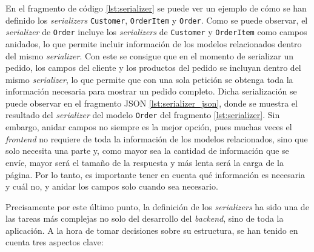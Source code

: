 En el fragmento de código \ref{lst:serializer} se puede ver un ejemplo de cómo se han definido los \textit{serializers} \texttt{Customer}, \texttt{OrderItem} y \texttt{Order}. Como se puede observar, el \textit{serializer} de \texttt{Order} incluye los \textit{serializers} de \texttt{Customer} y \texttt{OrderItem} como campos anidados, lo que permite incluir información de los modelos relacionados dentro del mismo \textit{serializer}. Con este se consigue que en el momento de serializar un pedido, los campos del cliente y los productos del pedido se incluyan dentro del mismo \textit{serializer}, lo que permite que con una sola petición se obtenga toda la información necesaria para mostrar un pedido completo. Dicha serialización se puede observar en el fragmento JSON \ref{lst:serializer_json}, donde se muestra el resultado del \textit{serializer} del modelo \texttt{Order} del fragmento \ref{lst:serializer}. Sin embargo, anidar campos no siempre es la mejor opción, pues muchas veces el \textit{frontend} no requiere de toda la información de los modelos relacionados, sino que solo necesita una parte y, como mayor sea la cantidad de información que se envíe, mayor será el tamaño de la respuesta y más lenta será la carga de la página. Por lo tanto, es importante tener en cuenta qué información es necesaria y cuál no, y anidar los campos solo cuando sea necesario.

\begin{center}
    \captionsetup{type=lstlisting, aboveskip=2mm, belowskip=2mm}
    \setlength{\fboxsep}{1pt}
    \begin{minipage}[t]{0.48\textwidth}
        
    \end{minipage}
    \hfill
    \begin{minipage}[t]{0.48\textwidth}
        
    \end{minipage}
    \vspace{2mm}
    \label{lst:serializer_json}
\end{center}

Precisamente por este último punto, la definición de los \textit{serializers} ha sido una de las tareas más complejas no solo del desarrollo del \textit{backend}, sino de toda la aplicación. A la hora de tomar decisiones sobre su estructura, se han tenido en cuenta tres aspectos clave:


